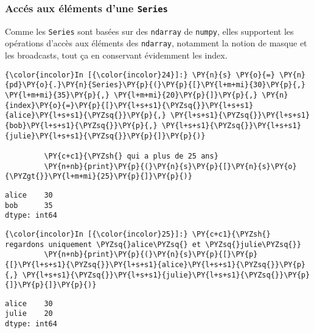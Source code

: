     \hypertarget{accuxe9s-aux-uxe9luxe9ments-dune-series}{%
\subsubsection{\texorpdfstring{Accés aux éléments d'une
\texttt{Series}}{Accés aux éléments d'une Series}}\label{accuxe9s-aux-uxe9luxe9ments-dune-series}}

    Comme les \texttt{Series} sont basées sur des \texttt{ndarray} de
\texttt{numpy}, elles supportent les opérations d'accès aux éléments des
\texttt{ndarray}, notamment la notion de masque et les broadcasts, tout
ça en conservant évidemment les index.

    \begin{Verbatim}[commandchars=\\\{\}]
{\color{incolor}In [{\color{incolor}24}]:} \PY{n}{s} \PY{o}{=} \PY{n}{pd}\PY{o}{.}\PY{n}{Series}\PY{p}{(}\PY{p}{[}\PY{l+m+mi}{30}\PY{p}{,} \PY{l+m+mi}{35}\PY{p}{,} \PY{l+m+mi}{20}\PY{p}{]}\PY{p}{,} \PY{n}{index}\PY{o}{=}\PY{p}{[}\PY{l+s+s1}{\PYZsq{}}\PY{l+s+s1}{alice}\PY{l+s+s1}{\PYZsq{}}\PY{p}{,} \PY{l+s+s1}{\PYZsq{}}\PY{l+s+s1}{bob}\PY{l+s+s1}{\PYZsq{}}\PY{p}{,} \PY{l+s+s1}{\PYZsq{}}\PY{l+s+s1}{julie}\PY{l+s+s1}{\PYZsq{}}\PY{p}{]}\PY{p}{)}
         
         \PY{c+c1}{\PYZsh{} qui a plus de 25 ans}
         \PY{n+nb}{print}\PY{p}{(}\PY{n}{s}\PY{p}{[}\PY{n}{s}\PY{o}{\PYZgt{}}\PY{l+m+mi}{25}\PY{p}{]}\PY{p}{)}
\end{Verbatim}


    \begin{Verbatim}[commandchars=\\\{\}]
alice    30
bob      35
dtype: int64

    \end{Verbatim}

    \begin{Verbatim}[commandchars=\\\{\}]
{\color{incolor}In [{\color{incolor}25}]:} \PY{c+c1}{\PYZsh{} regardons uniquement \PYZsq{}alice\PYZsq{} et \PYZsq{}julie\PYZsq{}}
         \PY{n+nb}{print}\PY{p}{(}\PY{n}{s}\PY{p}{[}\PY{p}{[}\PY{l+s+s1}{\PYZsq{}}\PY{l+s+s1}{alice}\PY{l+s+s1}{\PYZsq{}}\PY{p}{,} \PY{l+s+s1}{\PYZsq{}}\PY{l+s+s1}{julie}\PY{l+s+s1}{\PYZsq{}}\PY{p}{]}\PY{p}{]}\PY{p}{)}
\end{Verbatim}


    \begin{Verbatim}[commandchars=\\\{\}]
alice    30
julie    20
dtype: int64

    \end{Verbatim}


